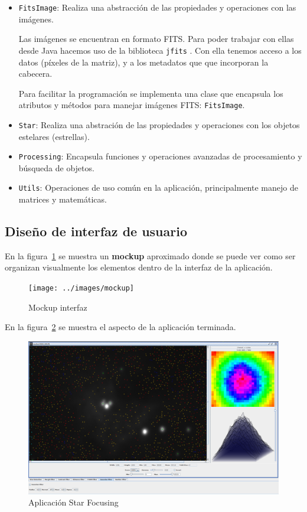 \begin{itemize}
	\item \texttt{FitsImage}: Realiza una abstracción de las propiedades  y operaciones con las imágenes.
	
	
	Las imágenes se encuentran en formato FITS. Para poder trabajar con ellas desde Java hacemos uso de la biblioteca \texttt{jfits} \cite{jfits}. Con ella tenemos acceso a los datos (píxeles de la matriz), y a los metadatos que que incorporan la cabecera. 
	
	
	Para facilitar la programación se implementa una clase que encapsula los atributos y métodos para manejar imágenes FITS: \texttt{FitsImage}.
	
	\item \texttt{Star}: Realiza una abstración de las propiedades  y operaciones con los objetos estelares (estrellas). 
	\item \texttt{Processing}: Encapsula funciones y operaciones avanzadas de procesamiento y búsqueda de objetos.
	\item \texttt{Utils}: Operaciones de uso común en la aplicación, principalmente manejo de matrices y matemáticas. 
\end{itemize}


\subsection{Diseño de interfaz de usuario}

En la figura~\ref{fig:mockuppp} se muestra un \textbf{mockup} aproximado donde se puede ver como ser organizan visualmente los elementos dentro de la interfaz de la aplicación.

\begin{figure}[!ht]
	\centering
	\texttt{[image: ../images/mockup]}
	\caption{Mockup interfaz}
	\label{fig:mockuppp}
\end{figure}


En la figura~\ref{fig:start_pocesor} se muestra el aspecto de la aplicación terminada.

\begin{figure}
\centering
\includegraphics[width=1\linewidth]{../images/start_pocesor}
\caption{Aplicación Star Focusing}
\label{fig:start_pocesor}
\end{figure}

